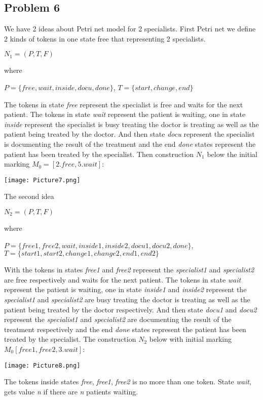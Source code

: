 \documentclass[a4paper]{article}
\begin{document}
\subsection{Problem 6}
We have 2 ideas about Petri net model for 2 specialists.\newline
First Petri net we define 2 kinds of tokens in one state free that representing 2 specialists.
\begin{center}
    $N_{1} = (P, T, F)$
\end{center}
where
\begin{center}
    $P = \{free, wait, inside, docu, done\}$,
    $T = \{start, change, end\}$
\end{center}
The tokens in state \textit{free} represent the specialist is free and waits for the next patient. The tokens in state \textit{wait} represent the patient is waiting, one in state \textit{inside} represent the specialist is busy treating the doctor is treating as well as the patient being treated by the doctor. And then state \textit{docu} represent the specialist is documenting the result of the treatment and the end \textit{done} states represent the patient has been treated by the specialist.
\newline
Then construction $N_{1}$ below the initial marking $M_{0} = [2.free, 5.wait]$:
\begin{center}
    \texttt{[image: Picture7.png]}
\end{center}
The second idea 
\begin{center}
    $N_{2} = (P, T, F)$
\end{center}
where
\begin{center}
    $P = \{free1,free2,wait,inside1,inside2,docu1,docu2,done\}$,
    $T = \{start1,start2,change1,change2,end1,end2\}$
\end{center}
With the tokens in states \textit{free1} and \textit{free2} represent the \textit{specialist1} and \textit{specialist2} are free respectively and waits for the next patient. The tokens in state \textit{wait} represent the patient is waiting, one in state \textit{inside1} and \textit{inside2} represent the \textit{specialist1} and \textit{specialist2} are busy treating the doctor is treating as well as the patient being treated by the doctor respectively. And then state \textit{docu1} and \textit{docu2} represent the \textit{specialist1} and \textit{specialist2} are documenting the result of the treatment respectively and the end \textit{done} states represent the patient has been treated by the specialist.
\newline
The construction $N_{2}$ below with initial marking $M_{0}[free1, free2, 3.wait]$:
\begin{center}
    \texttt{[image: Picture8.png]}
\end{center}
The tokens inside states \textit{free}, \textit{free1}, \textit{free2} is no more than one token. State \textit{wait}, gets value \textit{n} if there are \textit{n} patients waiting.
\end{document}
